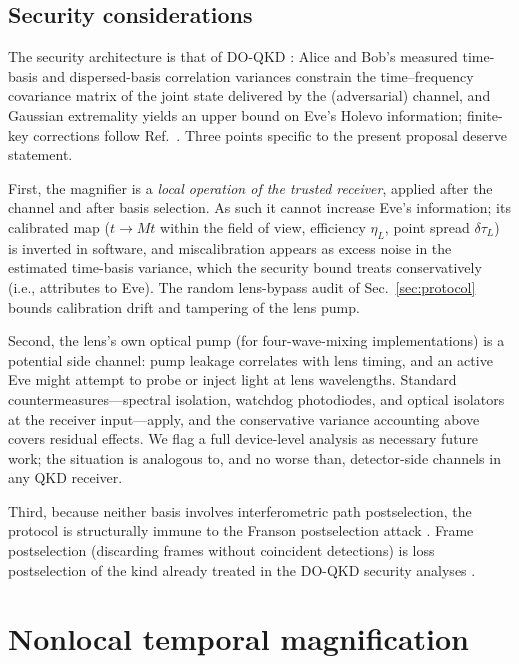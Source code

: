 \documentclass[11pt]{article}
\begin{document}
\subsection{Security considerations}
\label{sec:security}

The security architecture is that of DO-QKD \cite{Mower2013,Zhang2014,Niu2016}: Alice and Bob's measured time-basis and dispersed-basis correlation variances constrain the time--frequency covariance matrix of the joint state delivered by the (adversarial) channel, and Gaussian extremality yields an upper bound on Eve's Holevo information; finite-key corrections follow Ref.~\cite{Niu2016}. Three points specific to the present proposal deserve statement.

First, the magnifier is a \emph{local operation of the trusted receiver}, applied after the channel and after basis selection. As such it cannot increase Eve's information; its calibrated map ($t \to Mt$ within the field of view, efficiency $\eta_L$, point spread $\delta\tau_L$) is inverted in software, and miscalibration appears as excess noise in the estimated time-basis variance, which the security bound treats conservatively (i.e., attributes to Eve). The random lens-bypass audit of Sec.~\ref{sec:protocol} bounds calibration drift and tampering of the lens pump.

Second, the lens's own optical pump (for four-wave-mixing implementations) is a potential side channel: pump leakage correlates with lens timing, and an active Eve might attempt to probe or inject light at lens wavelengths. Standard countermeasures---spectral isolation, watchdog photodiodes, and optical isolators at the receiver input---apply, and the conservative variance accounting above covers residual effects. We flag a full device-level analysis as necessary future work; the situation is analogous to, and no worse than, detector-side channels in any QKD receiver.

Third, because neither basis involves interferometric path postselection, the protocol is structurally immune to the Franson postselection attack \cite{Aerts1999,Jogenfors2015}. Frame postselection (discarding frames without coincident detections) is loss postselection of the kind already treated in the DO-QKD security analyses \cite{Zhang2014,Niu2016}.

\section{Nonlocal temporal magnification}
\label{sec:nonlocal}
\end{document}
